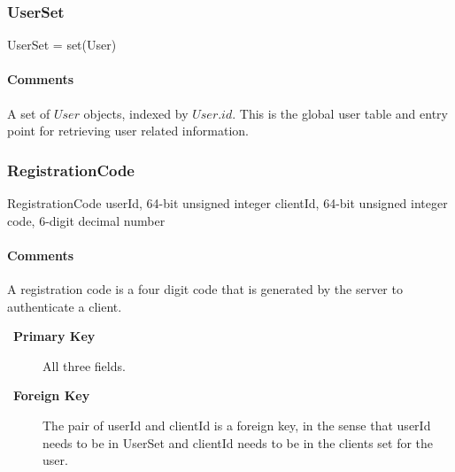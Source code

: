 \documentclass[a4paper,10pt,draft]{article}
\let\Item\item
\newcommand\SpecialItem{\renewcommand\item[1][]{\Item[\textbullet~\bfseries##1]}
}
\begin{document}
\subsubsection{UserSet}

\begin{verbbox}
UserSet = set(User)
\end{verbbox}
\begin{center}
\theverbbox
\end{center}

\begin{inparaitem}[ ]
 \item \secure
 \item \persistent
 \item \unique
\end{inparaitem}

\paragraph*{Comments}
A set of $User$ objects, indexed by $User.id$. This is the global user table and entry point for retrieving user related information.

\subsubsection{RegistrationCode}

\begin{verbbox}
RegistrationCode
{
  userId, 64-bit unsigned integer
  clientId, 64-bit unsigned integer
  code, 6-digit decimal number
}
\end{verbbox}
\begin{center}
\theverbbox
\end{center}

\begin{inparaitem}[ ]
 \item \infrastructure
\end{inparaitem}

\paragraph*{Comments}
A registration code is a four digit code that is generated by the server to authenticate a client.

\SpecialItem
\begin{description}
 \item[Primary Key] All three fields.
 \item[Foreign Key] The pair of userId and clientId is a foreign key, in the sense that userId needs to be in UserSet and clientId needs to be in the clients set for the user.
\end{description}
\end{document}
